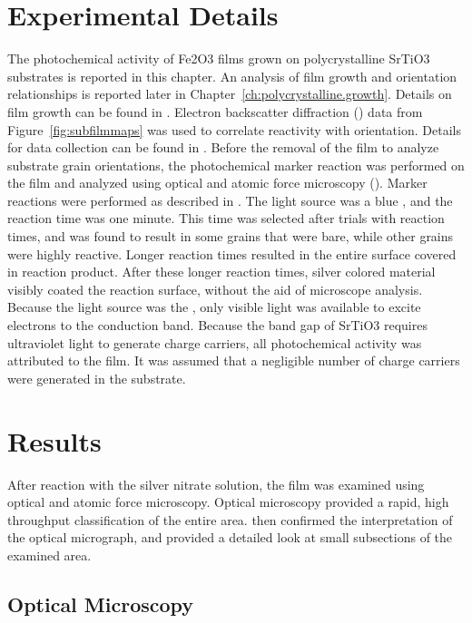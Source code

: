 \documentclass[12pt,%
              twoside,
               letterpaper]{uiothesis}
\begin{document}
\section{Experimental Details}
\label{sec:poly.reac.experimental}


The photochemical activity of Fe2O3 films grown on polycrystalline SrTiO3
substrates is reported in this chapter. An analysis of film growth and orientation
relationships is reported later in Chapter~\ref{ch:polycrystalline.growth}. Details on film
growth can be found in . Electron backscatter
diffraction () data from Figure~\ref{fig:subfilmmaps} was used to correlate
reactivity with orientation. Details for data collection can be found in
. Before the removal of the film to analyze
substrate grain orientations, the photochemical marker reaction was performed on the film
and analyzed using optical and atomic force microscopy (). Marker reactions were
performed as described in . The light source
was a blue , and the reaction time was one minute. This time was selected after
trials with reaction times, and was found to result in some grains that were bare, while
other grains were highly reactive. Longer reaction times resulted in the entire surface
covered in reaction product. After these longer reaction times, silver colored material
visibly coated the reaction surface, without the aid of microscope analysis. Because the
light source was the , only visible light was available to excite electrons to
the conduction band. Because the band gap of SrTiO3 requires ultraviolet light to
generate charge carriers, all photochemical activity was attributed to the film. It was
assumed that a negligible number of charge carriers were generated in the substrate.

\section{Results}
\label{sec:poly.reac.results}

After reaction with the silver nitrate solution, the film was examined using optical and
atomic force microscopy. Optical microscopy provided a rapid, high throughput
classification of the entire area.  then confirmed the interpretation of the
optical micrograph, and provided a detailed look at small subsections of the examined
area.


\subsection{Optical Microscopy}
\label{subsec:poly.reac.optical}
\end{document}
